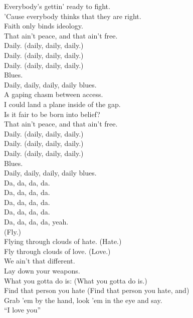 

Everybody's gettin' ready to fight. \\
'Cause everybody thinks that they are right. \\
Faith only binds ideology. \\
That ain't peace, and that ain't free. \\
Daily. (daily, daily, daily.) \\
Daily. (daily, daily, daily.) \\
Daily. (daily, daily, daily.) \\
Blues. \\
Daily, daily, daily, daily blues. \\

A gaping chasm between access. \\
I could land a plane inside of the gap. \\
Is it fair to be born into belief? \\
That ain't peace, and that ain't free. \\
Daily. (daily, daily, daily.) \\
Daily. (daily, daily, daily.) \\
Daily. (daily, daily, daily.) \\
Blues. \\
Daily, daily, daily, daily blues. \\

Da, da, da, da. \\
Da, da, da, da. \\
Da, da, da, da. \\
Da, da, da, da. \\
Da, da, da, da, yeah. \\

(Fly.) \\
Flying through clouds of hate. (Hate.) \\
Fly through clouds of love. (Love.) \\
We ain't that different. \\
Lay down your weapons. \\
What you gotta do is: (What you gotta do is.) \\
Find that person you hate (Find that person you hate, and) \\
Grab 'em by the hand, look 'em in the eye and say. \\
``I love you'' \\

